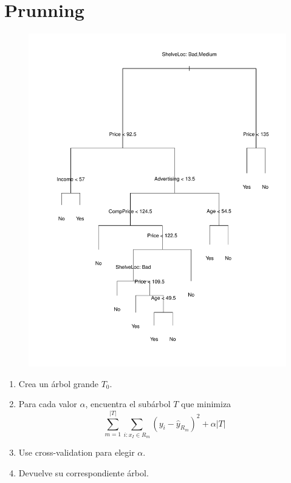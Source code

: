 \documentclass{beamer}
\theoremstyle{definition}
\begin{document}
\section{Prunning}
\begin{frame}
\begin{figure}[h!]
\includegraphics[scale=0.28]{arbolgrande}
\end{figure}
\end{frame}

\begin{frame}
\begin{enumerate}
	\item<1-> Crea un árbol grande $T_0$.
	\item<2-> Para cada valor $\alpha$, encuentra el subárbol $T$ que minimiza
	\[ \sum_{m=1}^{|T|} \sum_{i\colon x_I \in R_m} (y_i - \widehat{y}_{R_m})^2 + \alpha|T| \]
	\item<3-> Use cross-validation para elegir $\alpha$.
	\item<4-> Devuelve su correspondiente árbol.
\end{enumerate}
\end{frame}
\end{document}
